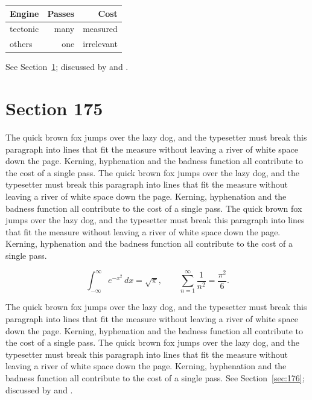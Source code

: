 \documentclass{article}
\begin{document}
\begin{center}
\begin{tabular}{lrr}
\toprule
Engine & Passes & Cost \\
\midrule
tectonic & many & measured \\
others & one & irrelevant \\
\bottomrule
\end{tabular}
\end{center}

See Section~\ref{sec:175}; discussed by \textcite{k5} and \textcite{l2}.
\section{Section 175}
\label{sec:175}
The quick brown fox jumps over the lazy dog, and the typesetter must break this paragraph into lines that fit the measure without leaving a river of white space down the page. Kerning, hyphenation and the badness function all contribute to the cost of a single pass. The quick brown fox jumps over the lazy dog, and the typesetter must break this paragraph into lines that fit the measure without leaving a river of white space down the page. Kerning, hyphenation and the badness function all contribute to the cost of a single pass. The quick brown fox jumps over the lazy dog, and the typesetter must break this paragraph into lines that fit the measure without leaving a river of white space down the page. Kerning, hyphenation and the badness function all contribute to the cost of a single pass. 

\begin{equation}\label{eq:175}
\int_{-\infty}^{\infty} e^{-x^{2}}\,dx = \sqrt{\pi}, \qquad
\sum_{n=1}^{\infty} \frac{1}{n^{2}} = \frac{\pi^{2}}{6}.
\end{equation}

The quick brown fox jumps over the lazy dog, and the typesetter must break this paragraph into lines that fit the measure without leaving a river of white space down the page. Kerning, hyphenation and the badness function all contribute to the cost of a single pass. The quick brown fox jumps over the lazy dog, and the typesetter must break this paragraph into lines that fit the measure without leaving a river of white space down the page. Kerning, hyphenation and the badness function all contribute to the cost of a single pass. 
See Section~\ref{sec:176}; discussed by \textcite{k1} and \textcite{l3}.
\end{document}

